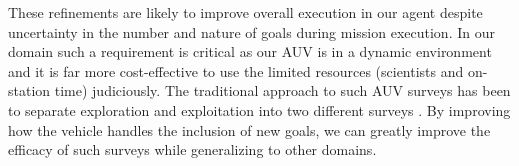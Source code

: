 
These refinements are likely to improve overall execution in our agent
despite uncertainty in the number and nature of goals during mission
execution. 
In our domain such a requirement is critical as our AUV is in a
dynamic environment and it is far more cost-effective to use the
limited resources (scientists and on-station time) judiciously.  The
traditional approach to such AUV surveys has been to separate
exploration and exploitation into two different surveys
\cite{Yoerger01012007}.  By improving how the vehicle handles the
inclusion of new goals, we can greatly improve the efficacy of such
surveys while generalizing to other domains.






